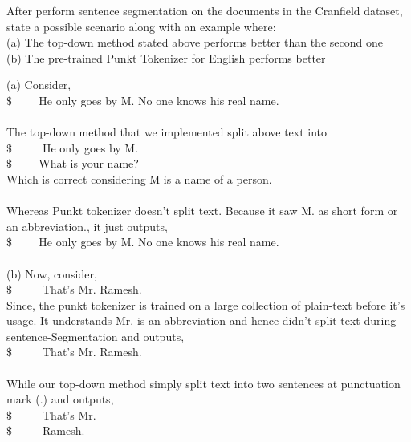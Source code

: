 \documentclass[11pt]{exam}
\begin{document}
\begin{questions}
\question After perform sentence segmentation on the documents in the Cranfield dataset, state a possible scenario along with an example where:\\
(a) The top-down method stated above performs better than the second one\\
(b) The pre-trained Punkt Tokenizer for English performs better\\
\begin{solution}
    (a) Consider,\\
    $\$\hspace{1cm}$He only goes by M. No one knows his real name.\\\\
    The top-down method that we implemented split above text into\\
    $\$\hspace{1cm}$ He only goes by M.\\
    $\$\hspace{1cm}$What is your name?\\
    Which is correct considering M is a name of a person.\\\\
    Whereas Punkt tokenizer doesn't split text. Because it saw M. as short form or an abbreviation., it just outputs, \\
    $\$\hspace{1cm}$He only goes by M. No one knows his real name.\\\\
    (b) Now, consider,\\
    $\$\hspace{1cm}$ That's Mr. Ramesh.\\
    Since, the punkt tokenizer is trained on a large collection of plain-text before it's usage. It understands Mr. is an abbreviation and hence didn't split text during sentence-Segmentation and outputs, \\
    $\$\hspace{1cm}$ That's Mr. Ramesh.\\\\
    While our top-down method simply split text into two sentences at punctuation mark (.) and outputs,\\
    $\$\hspace{1cm}$ That's Mr.\\
        $\$\hspace{1cm}$ Ramesh.\\

    
\end{solution}


\end{questions}
\end{document}
